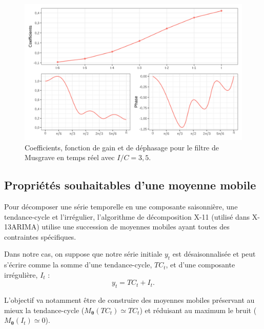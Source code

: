 \documentclass[
  12pt,
  a4paper,french]{article}
\newcommand\1{\mathds{1}}
\begin{document}
\begin{figure}[H]

{\centering \includegraphics[width=1\linewidth]{img/filters_used/musgrave} 

}

\caption[Coefficients, fonction de gain et de déphasage pour le filtre de Musgrave en temps réel avec \(I/C=3,5\)]{Coefficients, fonction de gain et de déphasage pour le filtre de Musgrave en temps réel avec \(I/C=3,5\).}\label{fig:graphsmusgrave}

\footnotesize
\normalsize\end{figure}

\hypertarget{propriuxe9tuxe9s-souhaitables-dune-moyenne-mobile}{%
\subsection{Propriétés souhaitables d'une moyenne mobile}\label{propriuxe9tuxe9s-souhaitables-dune-moyenne-mobile}}

Pour décomposer une série temporelle en une composante saisonnière, une tendance-cycle et l'irrégulier, l'algorithme de décomposition X-11 (utilisé dans X-13ARIMA) utilise une succession de moyennes mobiles ayant toutes des contraintes spécifiques.

Dans notre cas, on suppose que notre série initiale \(y_t\) est désaisonnalisée et peut s'écrire comme la somme d'une tendance-cycle, \(TC_t\), et d'une composante irrégulière, \(I_t\) :
\[
y_t=TC_t+I_t.
\]

L'objectif va notamment être de construire des moyennes mobiles préservant au mieux la tendance-cycle (\(M_{\boldsymbol\theta} (TC_t)\simeq TC_t\)) et réduisant au maximum le bruit (\(M_{\boldsymbol\theta} (I_t)\simeq 0\)).
\end{document}
